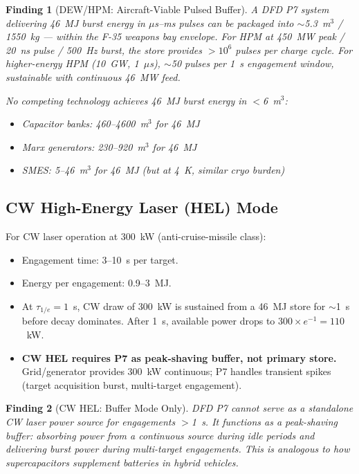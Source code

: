 \documentclass[11pt]{article}
\newtheorem{finding}{Finding}
\begin{document}
\begin{finding}[DEW/HPM: Aircraft-Viable Pulsed Buffer]
\label{find:DEW-aircraft}
A DFD P7 system delivering 46~MJ burst energy in $\mu$s--ms pulses can
be packaged into $\sim$5.3~m$^3$ / 1550~kg --- within the F-35 weapons
bay envelope. For HPM at 450~MW peak / 20~ns pulse / 500~Hz burst, the
store provides $>10^6$ pulses per charge cycle. For higher-energy HPM
(10~GW, 1~$\mu$s), $\sim$50 pulses per 1~s engagement window, sustainable
with continuous 46~MW feed.

No competing technology achieves 46~MJ burst energy in $<$6~m$^3$:
\begin{itemize}[nosep]
  \item Capacitor banks: 460--4600~m$^3$ for 46~MJ
  \item Marx generators: 230--920~m$^3$ for 46~MJ
  \item SMES: 5--46~m$^3$ for 46~MJ (but at 4~K, similar cryo burden)
\end{itemize}
\end{finding}

\subsection{CW High-Energy Laser (HEL) Mode}

For CW laser operation at 300~kW (anti-cruise-missile class):
\begin{itemize}[nosep]
  \item Engagement time: 3--10~s per target.
  \item Energy per engagement: 0.9--3~MJ.
  \item At $\tau_{1/e} = 1$~s, CW draw of 300~kW is sustained from a
    46~MJ store for $\sim$1~s before decay dominates. After 1~s,
    available power drops to $300 \times e^{-1} = 110$~kW.
  \item \textbf{CW HEL requires P7 as peak-shaving buffer, not primary
    store.} Grid/generator provides 300~kW continuous; P7 handles
    transient spikes (target acquisition burst, multi-target engagement).
\end{itemize}

\begin{finding}[CW HEL: Buffer Mode Only]
\label{find:HEL-buffer}
DFD P7 cannot serve as a standalone CW laser power source for engagements
$>$1~s. It functions as a peak-shaving buffer: absorbing power from a
continuous source during idle periods and delivering burst power during
multi-target engagements. This is analogous to how supercapacitors
supplement batteries in hybrid vehicles.
\end{finding}
\end{document}
